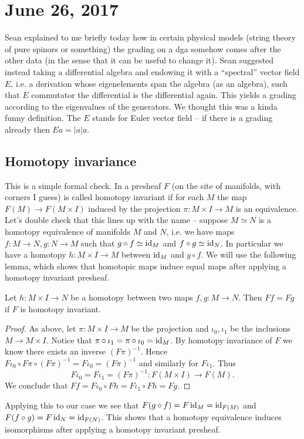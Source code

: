 \documentclass{amsart}
\begin{document}
\section{June 26, 2017}

Sean explained to me briefly today how in certain physical models (string theory
of pure spinors or something) the grading on a dga somehow comes after the other
data (in the sense that it can be useful to change it). Sean suggested instead
taking a differential algebra and endowing it with a ``spectral'' vector field $E$, i.e.
a derivation whose eigenelements span the algebra (as an algebra), such that
$E$ commutator the differential is the differential again. This yields a grading
according to the eigenvalues of the generators. We thought this was a kinda funny
definition. The $E$ stands for Euler vector field -- if there is a grading already
then $Ea=|a|a$.

\subsection{Homotopy invariance}

This is a simple formal check.
In \cite{bnv} a presheaf $F$ (on the site of manifolds, with corners I guess) is called
homotopy invariant if for each $M$ the map $F(M)\to F(M\times I)$ induced by the
projection $\pi: M\times I\to M$ is an equivalence. Let's double check that this lines
up with the name -- suppose $M\simeq N$ is a homotopy equivalence of manifolds $M$
and $N$, i.e. we have maps $f:M\to N, g:N\to M$ such that $g\circ f\simeq \operatorname{id}_M$
and $f\circ g\simeq \operatorname{id}_N$.
In particular we have a homotopy $h:M\times I\to M$ between $\operatorname{id}_M$ and $g\circ f$.
We will use the following lemma, which shows that homotopic maps induce equal maps
after applying a homotopy invariant presheaf.
\begin{lemma}
    Let $h:M\times I\to N$ be a homotopy between two maps $f,g:M\to N$.
    Then $Ff=Fg$ if $F$ is homotopy invariant.
\end{lemma}
\begin{proof}
    As above, let $\pi:M\times I\to M$ be the projection and $\iota_0,\iota_1$ be
    the inclusions $M\to M\times I$. Notice that $\pi\circ\iota_1=\pi\circ\iota_0=\operatorname{id}_M$.
    By homotopy invariance of $F$ we know there exists an inverse $(F\pi)^{-1}$.
    Hence $F\iota_0\circ F\pi\circ (F\pi)^{-1}=F\iota_0=(F\pi)^{-1}$ and similarly
    for $F\iota_1$. Thus
    \begin{equation*}
        F\iota_0=F\iota_1=(F\pi)^{-1} : F(M\times I)\to F(M).
    \end{equation*}
    We conclude that $Ff=F\iota_0\circ Fh = F\iota_1\circ Fh=Fg$.
\end{proof}
Applying this to our case we see that $F(g\circ f)=F\operatorname{id}_M=\operatorname{id}_{F(M)}$ and
$F(f\circ g)=F\operatorname{id}_N=\operatorname{id}_{F(N)}$. This shows that a homotopy equivalence induces
isomorphisms after applying a homotopy invariant presheaf.
\end{document}

